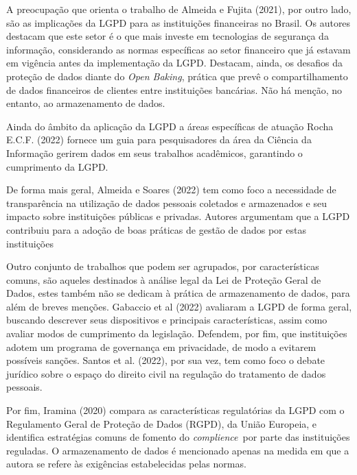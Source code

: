 A preocupação que orienta o trabalho de Almeida e Fujita (2021), por outro lado, são as implicações da LGPD para as instituições financeiras no Brasil. Os autores destacam que este setor é o que mais investe em tecnologias de segurança da informação, considerando as normas específicas ao setor financeiro que já estavam em vigência antes da implementação da LGPD. Destacam, ainda, os desafios da proteção de dados diante do \textit{\textit{Open Baking}}, prática que prevê o compartilhamento de dados financeiros de clientes entre instituições bancárias. Não há menção, no entanto, ao armazenamento de dados.

Ainda do âmbito da aplicação da LGPD a áreas específicas de atuação Rocha E.C.F. (2022) fornece um guia para pesquisadores da área da Ciência da Informação gerirem dados em seus trabalhos acadêmicos, garantindo o cumprimento da LGPD.

De forma mais geral, Almeida e Soares (2022) tem como foco a necessidade de transparência na utilização de dados pessoais coletados e armazenados e seu impacto sobre instituições públicas e privadas. Autores argumentam que a LGPD contribuiu para a adoção de boas práticas de gestão de dados por estas instituições

Outro conjunto de trabalhos que podem ser agrupados, por características comuns, são aqueles destinados à análise legal da Lei de Proteção Geral de Dados, estes também não se dedicam à prática de armazenamento de dados, para além de breves menções. Gabaccio et al (2022) avaliaram a LGPD de forma geral, buscando descrever seus dispositivos e principais características, assim como avaliar modos de cumprimento da legislação. Defendem, por fim, que instituições adotem um programa de governança em privacidade, de modo a evitarem possíveis sanções. Santos et al. (2022), por sua vez, tem como foco o debate jurídico sobre o espaço do direito civil na regulação do tratamento de dados pessoais.

Por fim, Iramina (2020) compara as características regulatórias da LGPD com o Regulamento Geral de Proteção de Dados (RGPD), da União Europeia, e identifica estratégias comuns de fomento do \textit{\textit{complience}} por parte das instituições reguladas. O armazenamento de dados é mencionado apenas na medida em que a autora se refere às exigências estabelecidas pelas normas.

